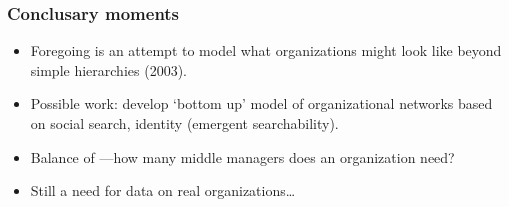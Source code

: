 \begin{frame}
  \frametitle{Conclusary moments}

  \begin{block}{}
    \begin{itemize}
    \item<1->
      Foregoing is an attempt to model what organizations
      might look like beyond simple hierarchies (2003).
    \item<2->
      Possible work: develop `bottom up' model of organizational
      networks based on social search, identity 
      (emergent searchability).
    \item<3->
      Balance of ---how many
      middle managers does an organization need?
    \item<4->
      Still a need for data on real organizations\ldots
    \end{itemize}
  \end{block}


\end{frame}





